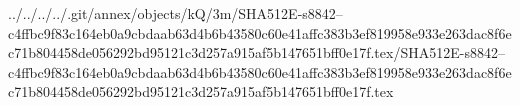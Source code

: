 ../../../../.git/annex/objects/kQ/3m/SHA512E-s8842--c4ffbc9f83c164eb0a9cbdaab63d4b6b43580c60e41affc383b3ef819958e933e263dac8f6ec71b804458de056292bd95121c3d257a915af5b147651bff0e17f.tex/SHA512E-s8842--c4ffbc9f83c164eb0a9cbdaab63d4b6b43580c60e41affc383b3ef819958e933e263dac8f6ec71b804458de056292bd95121c3d257a915af5b147651bff0e17f.tex